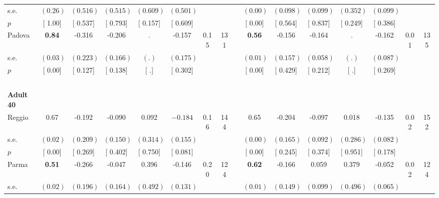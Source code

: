 \begin{longtable}{L{8em} c c c c c c c p{1em} c c c c c c c}
\quad \quad \quad \quad s.e.& $ (     0.26)$ & $ (    0.516)$ & $ (    0.515)$ & $ (    0.609)$ & $ (    0.501)$ & & & & $ (     0.00)$ & $ (    0.098)$ & $ (    0.099)$ & $ (    0.352)$ & $ (    0.099)$ & &  \\*
\quad \quad \quad \quad $ p$ & [     1.00] & [    0.537] & [    0.793] & [    0.157] & [    0.609] & & & & [     0.00] & [    0.564] & [    0.837] & [    0.249] & [    0.386] & &  \\[1em]
\quad \quad \quad Padova& \textbf{     0.84} &    -0.316 &    -0.206 &         . &    -0.157 &      0.15 &       131 & & \textbf{     0.56} &    -0.156 &    -0.164 &         . &    -0.162 &      0.01 &       135  \\*
\quad \quad \quad \quad s.e.& $ (     0.03)$ & $ (    0.223)$ & $ (    0.166)$ & $ (        .)$ & $ (    0.175)$ & & & & $ (     0.01)$ & $ (    0.157)$ & $ (    0.058)$ & $ (        .)$ & $ (    0.087)$ & &  \\*
\quad \quad \quad \quad $ p$ & [     0.00] & [    0.127] & [    0.138] & [        .] & [    0.302] & & & & [     0.00] & [    0.429] & [    0.212] & [        .] & [    0.269] & &  \\[1em]
~\\[1em]
\quad \quad \textbf{Adult 40} & & & & & & & & & & & & & & & \\* 
\quad \quad \quad Reggio& 0.67 &    -0.192 &    -0.090 &     0.092 & $ \mathbf{   -0.184}$ &      0.16 &       144 & & 0.65 &    -0.204 &    -0.097 &     0.018 &    -0.135 &      0.02 &       152  \\*
\quad \quad \quad \quad s.e.& $ (     0.02)$ & $ (    0.209)$ & $ (    0.150)$ & $ (    0.314)$ & $ (    0.155)$ & & & & $ (     0.00)$ & $ (    0.165)$ & $ (    0.092)$ & $ (    0.286)$ & $ (    0.082)$ & &  \\*
\quad \quad \quad \quad $ p$ & [     0.00] & [    0.269] & [    0.402] & [    0.750] & [    0.081] & & & & [     0.00] & [    0.245] & [    0.374] & [    0.951] & [    0.178] & &  \\[1em]
\quad \quad \quad Parma& \textbf{     0.51} &    -0.266 &    -0.047 &     0.396 &    -0.146 &      0.20 &       124 & & \textbf{     0.62} &    -0.166 &     0.059 &     0.379 &    -0.052 &      0.02 &       124  \\*
\quad \quad \quad \quad s.e.& $ (     0.02)$ & $ (    0.196)$ & $ (    0.164)$ & $ (    0.492)$ & $ (    0.131)$ & & & & $ (     0.01)$ & $ (    0.149)$ & $ (    0.099)$ & $ (    0.496)$ & $ (    0.065)$ & &  \\*

\end{longtable}
